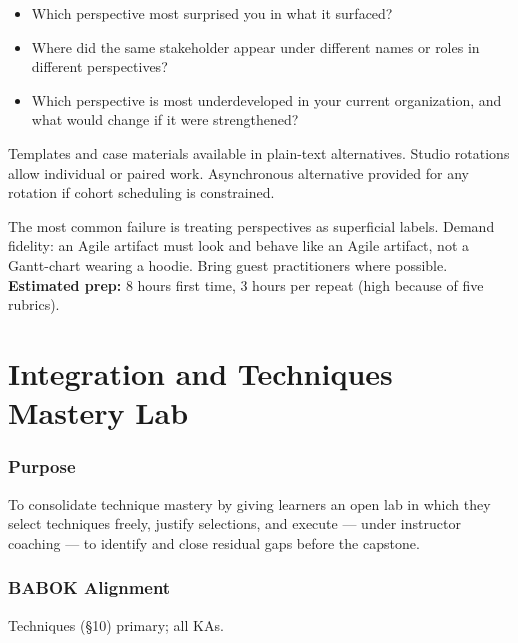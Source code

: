 \documentclass[11pt,letterpaper,oneside]{report}
\begin{document}
\begin{curriculumreflection}
\begin{itemize}
  \item Which perspective most surprised you in what it surfaced?
  \item Where did the same stakeholder appear under different names or roles in different perspectives?
  \item Which perspective is most underdeveloped in your current organization, and what would change if it were strengthened?
\end{itemize}
\end{curriculumreflection}

\begin{curriculumnote}
Templates and case materials available in plain-text alternatives. Studio rotations allow individual or paired work. Asynchronous alternative provided for any rotation if cohort scheduling is constrained.
\end{curriculumnote}

\begin{curriculumteachingnotes}
The most common failure is treating perspectives as superficial labels. Demand fidelity: an Agile artifact must look and behave like an Agile artifact, not a Gantt-chart wearing a hoodie. Bring guest practitioners where possible. \textbf{Estimated prep:} 8 hours first time, 3 hours per repeat (high because of five rubrics).
\end{curriculumteachingnotes}

\chapter{Integration and Techniques Mastery Lab}

\subsection*{Purpose}
To consolidate technique mastery by giving learners an open lab in which they select techniques freely, justify selections, and execute --- under instructor coaching --- to identify and close residual gaps before the capstone.

\subsection*{BABOK Alignment}
Techniques (\S10) primary; all KAs.
\end{document}
